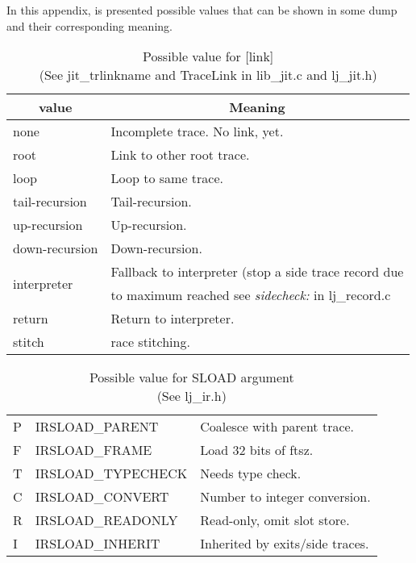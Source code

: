 
In this appendix, is presented possible values that can be shown in some dump
and their corresponding meaning.
\begin{table}
\centering
\begin{tabular}{|l|l|}
\hline
\multicolumn{1}{|c|}{value} & \multicolumn{1}{c|}{Meaning}\\\hline
none                        & Incomplete trace. No link, yet.\\\hline
root                        & Link to other root trace.\\\hline
loop                        & Loop to same trace.\\\hline
tail-recursion              & Tail-recursion.\\\hline
up-recursion                & Up-recursion.\\\hline
down-recursion              & Down-recursion.\\\hline
\multirow{2}{*}{interpreter}& Fallback to interpreter (stop a side trace record due\\
& to maximum reached see \emph{sidecheck:} in lj\_record.c\\\hline
return                      & Return to interpreter.\\\hline
stitch                      & race stitching.\\\hline
\end{tabular}
\caption{
  Possible value for [link] \\(See jit\_trlinkname and TraceLink in lib\_jit.c
  and lj\_jit.h)
}
\label{tab:dump-link}
\end{table}
\begin{table}
\centering
\begin{tabular}{|l|l|l|}
\hline
P & IRSLOAD\_PARENT    & Coalesce with parent trace.\\
F & IRSLOAD\_FRAME     & Load 32 bits of ftsz.\\
T & IRSLOAD\_TYPECHECK & Needs type check.\\
C & IRSLOAD\_CONVERT   & Number to integer conversion.\\
R & IRSLOAD\_READONLY  & Read-only, omit slot store.\\
I & IRSLOAD\_INHERIT   & Inherited by exits/side traces.\\
\hline
\end{tabular}
\caption{
  Possible value for SLOAD argument \\(See lj\_ir.h)
}
\label{tab:dump-sload}
\end{table}
